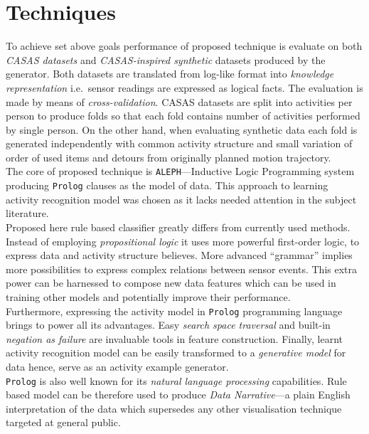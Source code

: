 \documentclass[12pt, a4paper, pdflatex, leqno, twoside, openright]{report}
\begin{document}
\section{Techniques}
To achieve set above goals performance of proposed technique is evaluate on both \emph{CASAS datasets} and \emph{CASAS-inspired synthetic} datasets produced by the generator. Both datasets are translated from log-like format into \emph{knowledge representation} i.e.\ sensor readings are expressed as logical facts. The evaluation is made by means of \emph{cross-validation}. CASAS datasets are split into activities per person to produce folds so that each fold contains number of activities performed by single person. On the other hand, when evaluating synthetic data each fold is generated independently with common activity structure and small variation of order of used items and detours from originally planned motion trajectory.\\

The core of proposed technique is \texttt{ALEPH}---Inductive Logic Programming system producing \texttt{Prolog} clauses as the model of data. This approach to learning activity recognition model was chosen as it lacks needed attention in the subject literature.\\

Proposed here rule based classifier greatly differs from currently used methods. Instead of employing \emph{propositional logic} it uses more powerful first-order logic, to express data and activity structure believes. More advanced ``grammar'' implies more possibilities to express complex relations between sensor events. This extra power can be harnessed to compose new data features which can be used in training other models and potentially improve their performance.\\

Furthermore, expressing the activity model in \texttt{Prolog} programming language brings to power all its advantages. Easy \emph{search space traversal} and built-in \emph{negation as failure} are invaluable tools in feature construction. Finally, learnt activity recognition model can be easily transformed to a \emph{generative model} for data hence, serve as an activity example generator.\\
\texttt{Prolog} is also well known for its \emph{natural language processing} capabilities. Rule based model can be therefore used to produce \emph{Data Narrative}---a plain English interpretation of the data which supersedes any other visualisation technique targeted at general public.\\
\end{document}
